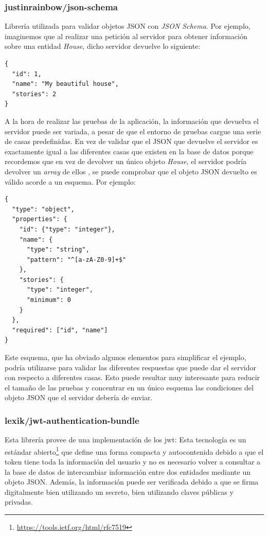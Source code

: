 \subsubsection{justinrainbow/json-schema}
\label{tech:sec:jsonschema}
Librería utilizada para validar objetos JSON con \textit{JSON Schema}. Por
ejemplo, imaginemos que al realizar una petición al servidor para
obtener información sobre una entidad \textit{House}, dicho servidor devuelve
lo siguiente:
\begin{verbatim}
{
  "id": 1,
  "name": "My beautiful house",
  "stories": 2
}
\end{verbatim}
A la hora de realizar las pruebas de la aplicación, la información que devuelva
el servidor puede ser variada, a pesar de que el entorno de pruebas cargue una
serie de casas predefinidas. En vez de validar que el JSON que devuelve el
servidor es exactamente igual a las diferentes casas que existen en la base de
datos \textemdash porque recordemos que en vez de devolver un único objeto
\textit{House}, el servidor podría devolver un \textit{array} de ellos
\textemdash, se puede comprobar que el objeto JSON devuelto es válido acorde a
un esquema. Por ejemplo:

\begin{verbatim}
{
  "type": "object",
  "properties": {
    "id": {"type": "integer"},
    "name": {
      "type": "string",
      "pattern": "^[a-zA-Z0-9]+$"
    },
    "stories": {
      "type": "integer",
      "minimum": 0
    }
  },
  "required": ["id", "name"]
}
\end{verbatim}
Este esquema, que ha obviado algunos elementos para simplificar el ejemplo,
podría utilizarse para validar las diferentes respuestas que puede dar el
servidor con respecto a diferentes casas. Esto puede resultar muy interesante
para reducir el tamaño de las pruebas y concentrar en un único esquema las
condiciones del objeto JSON que el servidor debería de enviar.

\subsubsection{lexik/jwt-authentication-bundle}
\label{sec:tech:jwt}
Esta librería provee de una implementación de los \gls{jwt}: Esta tecnología
es un estándar abierto\footnote{\url{https://tools.ietf.org/html/rfc7519}} que
define una forma compacta y autocontenida \textemdash debido a que el token
tiene toda la información del usuario y no es necesario volver a consultar a la
base de datos \textemdash de intercambiar
información entre dos entidades mediante un objeto JSON. Además, la información
puede ser verificada debido a que se firma digitalmente bien utilizando un
secreto, bien utilizando claves públicas y privadas. \cite{jwt_explanation}

